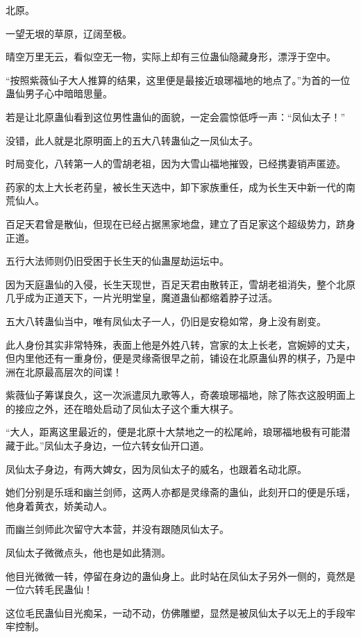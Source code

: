 
\begin{this_body}

北原。

一望无垠的草原，辽阔至极。

晴空万里无云，看似空无一物，实际上却有三位蛊仙隐藏身形，漂浮于空中。

“按照紫薇仙子大人推算的结果，这里便是最接近琅琊福地的地点了。”为首的一位蛊仙男子心中暗暗思量。

若是让北原蛊仙看到这位男性蛊仙的面貌，一定会震惊低呼一声：“凤仙太子！”

没错，此人就是北原明面上的五大八转蛊仙之一凤仙太子。

时局变化，八转第一人的雪胡老祖，因为大雪山福地摧毁，已经携妻销声匿迹。

药家的太上大长老药皇，被长生天选中，卸下家族重任，成为长生天中新一代的南荒仙人。

百足天君曾是散仙，但现在已经占据黑家地盘，建立了百足家这个超级势力，跻身正道。

五行大法师则仍旧受困于长生天的仙蛊屋劫运坛中。

因为天庭蛊仙的入侵，长生天现世，百足天君由散转正，雪胡老祖消失，整个北原几乎成为正道天下，一片光明堂皇，魔道蛊仙都缩着脖子过活。

五大八转蛊仙当中，唯有凤仙太子一人，仍旧是安稳如常，身上没有剧变。

此人身份其实非常特殊，表面上他是外姓八转，宫家的太上长老，宫婉婷的丈夫，但内里他还有一重身份，便是灵缘斋很早之前，铺设在北原蛊仙界的棋子，乃是中洲在北原最高层次的间谍！

紫薇仙子筹谋良久，这一次派遣凤九歌等人，奇袭琅琊福地，除了陈衣这股明面上的接应之外，还在暗处启动了凤仙太子这个重大棋子。

“大人，距离这里最近的，便是北原十大禁地之一的松尾岭，琅琊福地极有可能潜藏于此。”凤仙太子身边，一位六转女仙开口道。

凤仙太子身边，有两大婢女，因为凤仙太子的威名，也跟着名动北原。

她们分别是乐瑶和幽兰剑师，这两人亦都是灵缘斋的蛊仙，此刻开口的便是乐瑶，他身着黄衣，娇美动人。

而幽兰剑师此次留守大本营，并没有跟随凤仙太子。

凤仙太子微微点头，他也是如此猜测。

他目光微微一转，停留在身边的蛊仙身上。此时站在凤仙太子另外一侧的，竟然是一位六转毛民蛊仙！

这位毛民蛊仙目光痴呆，一动不动，仿佛雕塑，显然是被凤仙太子以无上的手段牢牢控制。


\end{this_body}
